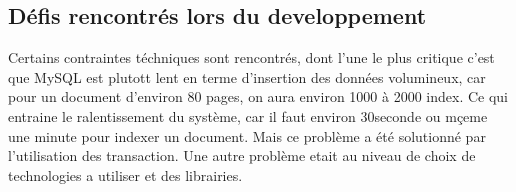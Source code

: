 
\subsection{Défis rencontrés lors du developpement}
Certains contraintes téchniques sont rencontrés, dont l'une le plus critique c'est que MySQL est plutott lent en terme d'insertion des données volumineux, car pour un document d'environ 80 pages, on aura environ 1000 à 2000 index. Ce qui entraine le ralentissement du système, car il faut environ 30seconde ou mçeme une minute pour indexer un document. Mais ce problème a été solutionné par l'utilisation des transaction. Une autre problème etait au niveau de choix de technologies a utiliser et des librairies.

